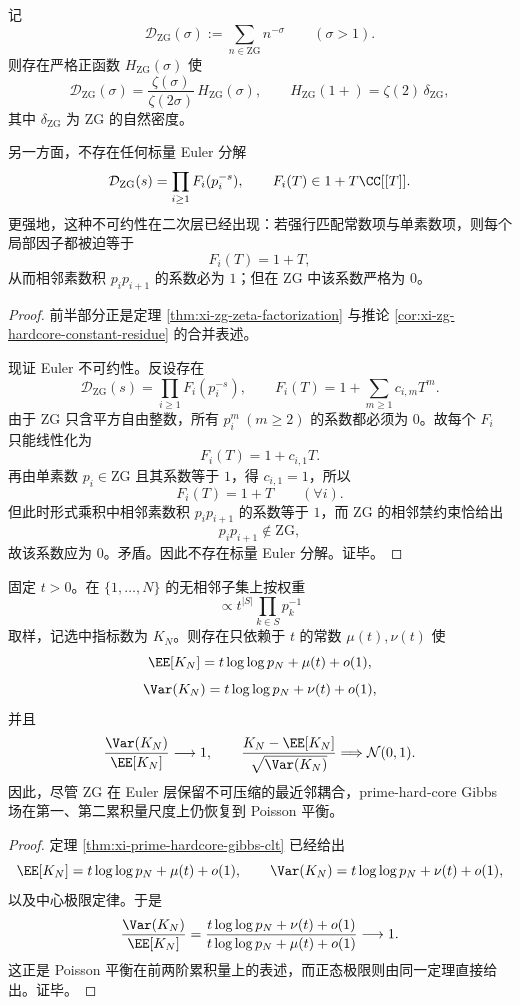 \begin{theorem}\label{thm:derived-zg-tauberian-complete-euler-irreducible}
记
\[
\mathcal D_{\mathrm{ZG}}(\sigma):=\sum_{n\in \mathrm{ZG}}n^{-\sigma}
\qquad (\sigma>1).
\]
则存在严格正函数 \(H_{\mathrm{ZG}}(\sigma)\) 使
\[
\mathcal D_{\mathrm{ZG}}(\sigma)
=
\frac{\zeta(\sigma)}{\zeta(2\sigma)}\,H_{\mathrm{ZG}}(\sigma),
\qquad
H_{\mathrm{ZG}}(1+)=\zeta(2)\,\delta_{\mathrm{ZG}},
\]
其中 \(\delta_{\mathrm{ZG}}\) 为 \(\mathrm{ZG}\) 的自然密度。

另一方面，不存在任何标量 Euler 分解
\[
\mathcal D_{\mathrm{ZG}}(s)=\prod_{i\ge 1}F_i(p_i^{-s}),
\qquad
F_i(T)\in 1+T\CC[[T]].
\]
更强地，这种不可约性在二次层已经出现：若强行匹配常数项与单素数项，则每个局部因子都被迫等于
\[
F_i(T)=1+T,
\]
从而相邻素数积 \(p_ip_{i+1}\) 的系数必为 \(1\)；但在 \(\mathrm{ZG}\) 中该系数严格为 \(0\)。
\end{theorem}
\begin{proof}
前半部分正是定理 \ref{thm:xi-zg-zeta-factorization} 与推论 \ref{cor:xi-zg-hardcore-constant-residue} 的合并表述。

现证 Euler 不可约性。反设存在
\[
\mathcal D_{\mathrm{ZG}}(s)=\prod_{i\ge 1}F_i(p_i^{-s}),
\qquad
F_i(T)=1+\sum_{m\ge 1}c_{i,m}T^m.
\]
由于 \(\mathrm{ZG}\) 只含平方自由整数，所有 \(p_i^m\ (m\ge 2)\) 的系数都必须为 \(0\)。故每个 \(F_i\) 只能线性化为
\[
F_i(T)=1+c_{i,1}T.
\]
再由单素数 \(p_i\in \mathrm{ZG}\) 且其系数等于 \(1\)，得 \(c_{i,1}=1\)，所以
\[
F_i(T)=1+T
\qquad (\forall i).
\]
但此时形式乘积中相邻素数积 \(p_ip_{i+1}\) 的系数等于 \(1\)，而 \(\mathrm{ZG}\) 的相邻禁约束恰给出
\[
p_ip_{i+1}\notin \mathrm{ZG},
\]
故该系数应为 \(0\)。矛盾。因此不存在标量 Euler 分解。证毕。
\end{proof}

\begin{theorem}\label{thm:derived-zg-prime-hardcore-poisson-balance}
固定 \(t>0\)。在 \(\{1,\dots,N\}\) 的无相邻子集上按权重
\[
\propto t^{|S|}\prod_{k\in S}p_k^{-1}
\]
取样，记选中指标数为 \(K_N\)。则存在只依赖于 \(t\) 的常数 \(\mu(t),\nu(t)\) 使
\[
\EE[K_N]=t\log\log p_N+\mu(t)+o(1),
\]
\[
\Var(K_N)=t\log\log p_N+\nu(t)+o(1),
\]
并且
\[
\frac{\Var(K_N)}{\EE[K_N]}\longrightarrow 1,
\qquad
\frac{K_N-\EE[K_N]}{\sqrt{\Var(K_N)}}\Longrightarrow \mathcal N(0,1).
\]
因此，尽管 \(\mathrm{ZG}\) 在 Euler 层保留不可压缩的最近邻耦合，prime-hard-core Gibbs 场在第一、第二累积量尺度上仍恢复到 Poisson 平衡。
\end{theorem}
\begin{proof}
定理 \ref{thm:xi-prime-hardcore-gibbs-clt} 已经给出
\[
\EE[K_N]=t\log\log p_N+\mu(t)+o(1),
\qquad
\Var(K_N)=t\log\log p_N+\nu(t)+o(1),
\]
以及中心极限定律。于是
\[
\frac{\Var(K_N)}{\EE[K_N]}
=
\frac{t\log\log p_N+\nu(t)+o(1)}{t\log\log p_N+\mu(t)+o(1)}
\longrightarrow 1.
\]
这正是 Poisson 平衡在前两阶累积量上的表述，而正态极限则由同一定理直接给出。证毕。
\end{proof}
